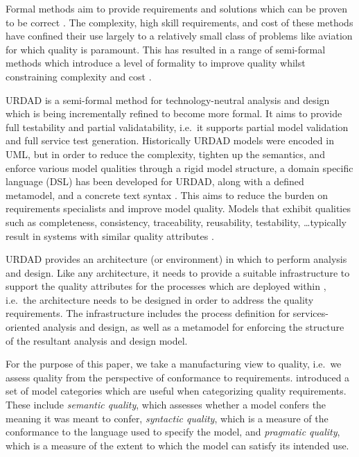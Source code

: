 Formal methods aim to provide requirements and solutions which can be proven to be correct \cite{hinchey_software_2008}. The complexity, high skill requirements, and cost of these methods have confined their use largely to a relatively small class of problems like aviation \cite{hall_software_1992} for which quality is paramount. This has resulted in a range of semi-formal methods which introduce a level of formality to improve quality whilst constraining complexity and cost \cite{}.

URDAD is a semi-formal method for technology-neutral analysis and design \cite{solms_urdad_2010} which is being incrementally refined to become more formal. It aims to provide full testability and partial validatability, i.e.\ it supports partial model validation and full service test generation. Historically URDAD models were encoded in UML, but in order to reduce the complexity, tighten up the semantics, and enforce various model qualities through a rigid model structure, a domain specific language (DSL) has been developed for URDAD, along with a defined metamodel, and a concrete text syntax \cite{solmsfritz_domain-specific_????}. This aims to reduce the burden on requirements specialists and improve model quality. Models that exhibit qualities such as completeness, consistency, traceability, reusability, testability, \dots typically result in systems with similar quality attributes \cite{podgorelec_estimating_2007}.

URDAD provides an architecture (or environment) in which to perform analysis and design. Like any architecture, it needs to provide a suitable infrastructure to support the quality attributes for the processes which are deployed within \cite{}, i.e.\ the architecture needs to be designed in order to address the quality requirements. The infrastructure includes the process definition for services-oriented analysis and design, as well as a metamodel for enforcing the structure of the resultant analysis and design model.

For the purpose of this paper, we take a manufacturing view \cite{garvin_what_1984} to quality, i.e.\ we assess quality from the perspective of conformance to requirements. \cite{lindland_understanding_1994} introduced a set of model categories which are useful when categorizing quality requirements. These include \emph{semantic quality}, which assesses whether a model confers the meaning it was meant to confer, \emph{syntactic quality}, which is a measure of the conformance to the language used to specify the model, and \emph{pragmatic quality}, which is a measure of the extent to which the model can satisfy its intended use.


